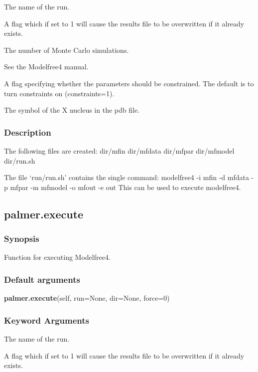   The name of the run.

  A flag which if set to 1 will cause the results file to be overwritten if it already exists.

  The number of Monte Carlo simulations.

  See the Modelfree4 manual.

  A flag specifying whether the parameters should be constrained.  The default is to turn constraints on (constraints=1).

  The symbol of the X nucleus in the pdb file.


\subsubsection{Description}

The following files are created:
    dir/mfin
    dir/mfdata
    dir/mfpar
    dir/mfmodel
    dir/run.sh

The file `run/run.sh' contains the single command:
    modelfree4 -i mfin -d mfdata -p mfpar -m mfmodel -o mfout -e out
This can be used to execute modelfree4.


\newpage

\subsection{palmer.execute}


\subsubsection{Synopsis}

Function for executing Modelfree4.

\subsubsection{Default arguments}

\textsf{\textbf{palmer.execute}(self, run=None, dir=None, force=0)}


\subsubsection{Keyword Arguments}

  The name of the run.

  A flag which if set to 1 will cause the results file to be overwritten if it already exists.

